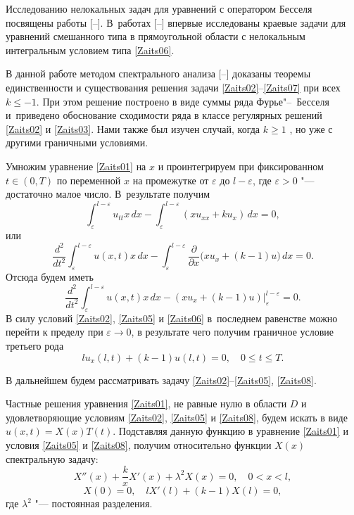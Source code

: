 Исследованию нелокальных задач для уравнений с оператором Бесселя посвящены работы [--]. 
В~работах [--] впервые исследованы краевые задачи для уравнений смешанного типа в прямоугольной области с нелокальным интегральным условием типа \eqref{Zaits06}.

В данной работе методом спектрального анализа [--] доказаны теоремы единственности и существования решения задачи \eqref{Zaits02}--\eqref{Zaits07} при всех $k\leq -1$. 
При этом решение построено в виде суммы ряда Фурье"--~Бесселя и~приведено обоснование сходимости ряда в классе регулярных решений \eqref{Zaits02} и \eqref{Zaits03}. 
Нами также был изучен случай, когда $k\geq1$ \cite{Zaitseva:new2017-en}, но уже с другими граничными условиями.



Умножим уравнение \eqref{Zaits01} на $x$ и проинтегрируем при фиксированном $t\in(0, T)$ по переменной $x$ на промежутке от $\varepsilon$ до $l-\varepsilon$, 
где $\varepsilon>0$ "--- достаточно малое число. 
В~результате получим
$$ \int _\varepsilon^{l-\varepsilon}u_{tt}x\,dx- \int _\varepsilon^{l-\varepsilon}(xu_{xx}+ku_x)\,dx=0,$$
или
$$\frac{d^2}{dt^2} \int _\varepsilon^{l-\varepsilon}u(x,t)x\,dx- \int _\varepsilon^{l-\varepsilon}\frac{\partial }{\partial x}\bigl(xu_x+(k-1)u\bigr)\,dx=0.$$
Отсюда будем иметь
$$\frac{d^2}{dt^2} \int _\varepsilon^{l-\varepsilon}u(x,t)x\,dx-\left(xu_x+(k-1)u\right)\Bigr|_\varepsilon^{l-\varepsilon}=0.$$
В силу условий \eqref{Zaits02}, \eqref{Zaits05} и \eqref{Zaits06} в~последнем равенстве можно перейти к пределу при $\varepsilon\rightarrow0$, в результате чего получим граничное условие третьего рода
\begin{equation}
\label{Zaits08}
lu_x(l,t)+(k-1)u(l,t)=0,\quad 0\leq t\leq T.
\end{equation}

В дальнейшем будем рассматривать задачу \eqref{Zaits02}--\eqref{Zaits05}, \eqref{Zaits08}.


\smallskip

Частные решения уравнения \eqref{Zaits01}, не равные нулю в области $D$ и удовлетворяющие условиям \eqref{Zaits02}, \eqref{Zaits05} и \eqref{Zaits08}, будем искать в виде $u(x,t)=X(x)T(t)$. 
Подставляя данную функцию в уравнение \eqref{Zaits01} и условия \eqref{Zaits05} и \eqref{Zaits08}, получим относительно функции $X(x)$ спектральную задачу:
\begin{equation}
\label{Zaits09}
X''(x)+\frac{k}{x}X'(x)+\lambda^2X(x)=0,\quad 0<x<l,
\end{equation}
\begin{equation}
\label{Zaits10}
X(0)=0,\quad lX'(l)+(k-1)X(l)=0,
\end{equation}
где $\lambda^2$ "--- постоянная разделения.

